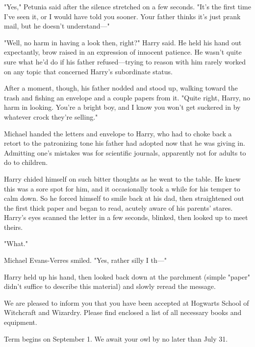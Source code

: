 "Yes," Petunia said after the silence stretched on a few
seconds. "It's the first time I've seen it, or I would have
told you sooner. Your father thinks it's just prank mail, but
he doesn't understand—"

"Well, no harm in having a look then, right?" Harry said.
He held his hand out expectantly, brow raised in an
expression of innocent patience. He wasn't quite sure what
he'd do if his father refused—trying to reason with him
rarely worked on any topic that concerned Harry's
subordinate status.

After a moment, though, his father nodded and stood up,
walking toward the trash and fishing an envelope and a
couple papers from it. "Quite right, Harry, no harm in
looking. You're a bright boy, and I know you won't get
suckered in by whatever crock they're selling."

Michael handed the letters and envelope to Harry, who
had to choke back a retort to the patronizing tone his
father had adopted now that he was giving in. Admitting
one's mistakes was for scientific journals, apparently{\el} not
for adults to do to children.

Harry chided himself on such bitter thoughts as he went
to the table. He knew this was a sore spot for him, and it
occasionally took a while for his temper to calm down. So
he forced himself to smile back at his dad, then
straightened out the first thick paper and began to
read, acutely aware of his parents' stares.
Harry's eyes scanned the letter in a few seconds, blinked,
then looked up to meet theirs.

"What."

Michael Evans-Verres smiled. "Yes, rather silly I th—"

Harry held up his hand, then looked back down at the
parchment (simple "paper" didn't suffice to describe this material)
and slowly reread the message.

\begin{writtenNote}

We are pleased to inform you that you have been
accepted at Hogwarts School of Witchcraft and Wizardry.
Please find enclosed a list of all necessary books and
equipment.

Term begins on September 1. We await your owl by no
later than July 31.


\end{writtenNote}

